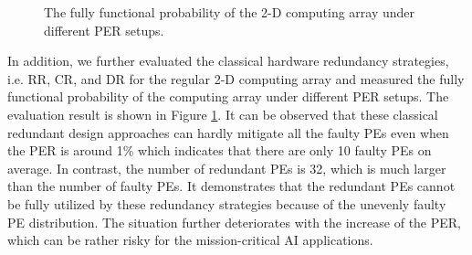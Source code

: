 \begin{figure}
    \setlength{\abovecaptionskip}{-1pt}
    \setlength{\belowcaptionskip}{0pt}
            \caption{The fully functional probability of the 2-D computing array under different PER setups.}
            \label{fig:mo}
            \vspace{-1em}
\end{figure}

In addition, we further evaluated the classical hardware redundancy strategies, i.e. RR, CR, and DR for the regular 2-D computing array and measured the fully functional probability of the computing array under different PER setups. The evaluation result is shown in Figure \ref{fig:mo}. It can be observed that these classical redundant design approaches can hardly mitigate all the faulty PEs even when the PER is around 1\% which indicates that there are only 10 faulty PEs on average. In contrast, the number of redundant PEs is 32, which is much larger than the number of faulty PEs. It demonstrates that the redundant PEs cannot be fully utilized by these redundancy strategies because of the unevenly faulty PE distribution. The situation further deteriorates with the increase of the PER, which can be rather risky for the mission-critical AI applications.


